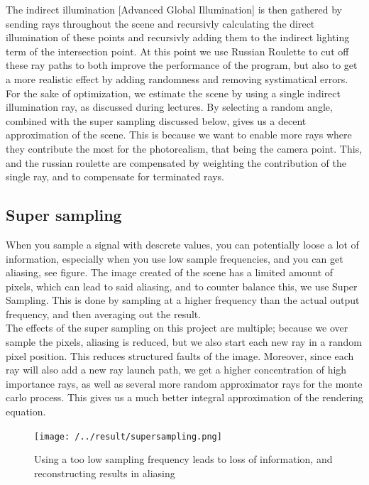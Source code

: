 \documentclass[12pt]{article}
\numberwithin{equation}{section}
\begin{document}
The indirect illumination [Advanced Global Illumination] is then gathered by sending rays throughout the scene and recursivly calculating the direct illumination of these points and recursivly adding them to the indirect lighting term of the intersection point. At this point we use Russian Roulette to cut off these ray paths to both improve the performance of the program, but also to get a more realistic effect by adding randomness and removing systimatical errors.\\

For the sake of optimization, we estimate the scene by using a single indirect illumination ray, as discussed during lectures. By selecting a random angle, combined with the super sampling discussed below, gives us a decent approximation of the scene. This is because we want to enable more rays where they contribute the most for the photorealism, that being the camera point. This, and the russian roulette are compensated by weighting the contribution of the single ray, and to compensate for terminated rays.


\subsection{Super sampling}

When you sample a signal with descrete values, you can potentially loose a lot of information, especially when you use low sample frequencies, and you can get aliasing, see figure. The image created of the scene has a limited amount of pixels, which can lead to said aliasing, and to counter balance this, we use Super Sampling. This is done by sampling at a higher frequency than the actual output frequency, and then averaging out the result.\\ 

The effects of the super sampling on this project are multiple; because we over sample the pixels, aliasing is reduced, but we also start each new ray in a random pixel position. This reduces structured faults of the image. Moreover, since each ray will also add a new ray launch path, we get a higher concentration of high importance rays, as well as several more random approximator rays for the monte carlo process. This gives us a much better integral approximation of the rendering equation.

\begin{figure}
  \begin{center}
    \texttt{[image: /../result/supersampling.png]}
    \caption{Using a too low sampling frequency leads to loss of information, and reconstructing results in aliasing}
    \label{fig:aliasing}
  \end{center}
\end{figure}
\end{document}
